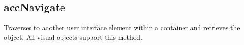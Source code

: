 \documentclass[letterpaper,12pt,english,openany,oneside]{sphinxmanual}
\begin{document}
\subsection{accNavigate}
\label{\detokenize{MSAA_PDF:accnavigate}}
Traverses to another user interface element within a container and retrieves the object. All visual objects support this method.

\begin{sphinxVerbatim}[commandchars=\\\{\}]
      
\end{sphinxVerbatim}

\end{document}
